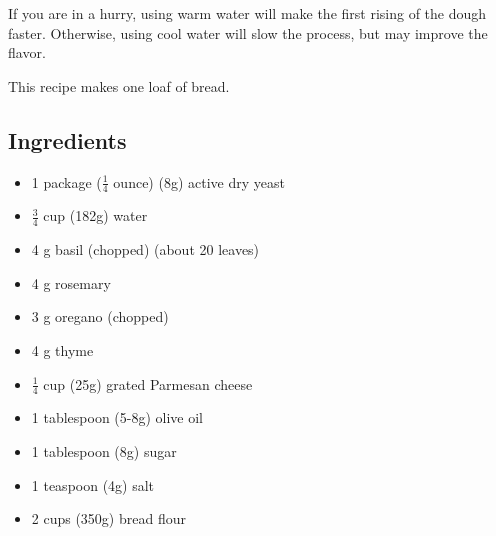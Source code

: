 \documentclass[10pt, openany]{book}
\begin{document}
If you are in a hurry, using warm water will make the first rising of the dough faster.  Otherwise, using cool water will slow the process, but may improve the flavor.

This recipe makes one loaf of bread.

\subsection{Ingredients}
\begin{itemize}
  \item 1 package ($\frac{1}{4}$ ounce) (8g) active dry yeast
  \item $\frac{3}{4}$ cup (182g) water
  \item 4 g basil (chopped) (about 20 leaves)
  \item 4 g rosemary
  \item 3 g oregano (chopped)
  \item 4 g thyme
  \item $\frac{1}{4}$ cup (25g) grated Parmesan cheese
  \item 1 tablespoon (5-8g) olive oil
  \item 1 tablespoon (8g) sugar
  \item 1 teaspoon (4g) salt
  \item 2 cups (350g) bread flour
\end{itemize}
\end{document}
